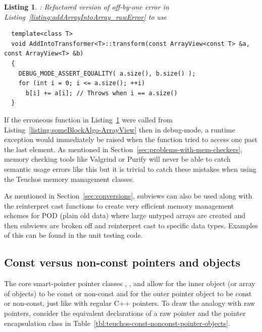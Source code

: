 \documentclass[pdf,ps2pdf,11pt]{SANDreport}
\newtheorem{listing}{Listing}
\begin{document}
{}\begin{listing}: Refactored version of off-by-one error in
Listing~\ref{listing:addArrayIntoArray_rawError} to use
{} \\
\label{listing:addArrayIntoArray-ArrayViewError}
{\small\begin{verbatim}
  template<class T>
  void AddIntoTransformer<T>::transform(const ArrayView<const T> &a, const ArrayView<T> &b)
  {
    DEBUG_MODE_ASSERT_EQUALITY( a.size(), b.size() );
    for (int i = 0; i <= a.size(); ++i)
      b[i] += a[i]; // Throws when i == a.size()
  }
\end{verbatim}}
\end{listing}

If the erroneous {} function in
Listing~\ref{listing:addArrayIntoArray-ArrayViewError} were called
from Listing~\ref{listing:someBlockAlgo-ArrayView} then in debug-mode,
a runtime exception would immediately be raised when the
{} function tried to access one past the last
element.  As mentioned in
Section~\ref{sec:problems-with-mem-checkers}, memory checking tools
like Valgrind or Purify will never be able to catch semantic usage
errors like this but it is trivial to catch these mistakes when using
the Teuchos memory management classes.

As mentioned in Section~\ref{sec:conversions}, subviews can also
be used along with the reinterpret cast functions to create very
efficient memory management schemes for POD (plain old data) where
large untyped {} arrays are created and then subviews are
broken off and reinterpret cast to specific data types.  Examples of
this can be found in the unit testing code.


%
{}\subsection{Const versus non-const pointers and objects}
\label{sec:teuchos-const-nonconst-pointer-objects}
%

The core smart-pointer pointer classes {}, {},
{} and {} allow for the inner object (or
array of objects) to be const or non-const and for the outer pointer
object to be const or non-const, just like with regular C++ pointers.
To draw the analogy with raw pointers, consider the equivalent
declarations of a raw pointer and the pointer encapsulation class in
Table~\ref{tbl:teuchos-const-nonconst-pointer-objects}.
\end{document}
